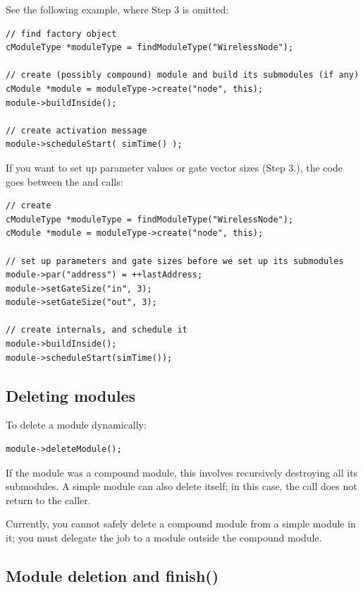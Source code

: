 See the following example, where Step 3 is omitted:

\begin{verbatim}
// find factory object
cModuleType *moduleType = findModuleType("WirelessNode");

// create (possibly compound) module and build its submodules (if any)
cModule *module = moduleType->create("node", this);
module->buildInside();

// create activation message
module->scheduleStart( simTime() );
\end{verbatim}

If you want to set up parameter values or gate vector sizes (Step 3.),
the code goes between the  and
 calls:

\begin{verbatim}
// create
cModuleType *moduleType = findModuleType("WirelessNode");
cModule *module = moduleType->create("node", this);

// set up parameters and gate sizes before we set up its submodules
module->par("address") = ++lastAddress;
module->setGateSize("in", 3);
module->setGateSize("out", 3);

// create internals, and schedule it
module->buildInside();
module->scheduleStart(simTime());
\end{verbatim}


\subsection{Deleting modules}


To delete a module dynamically:

\begin{verbatim}
module->deleteModule();
\end{verbatim}

If the module was a compound module, this involves recursively
destroying all its submodules. A simple module can also delete itself;
in this case, the  call does not return to the
caller.

Currently, you cannot safely delete a
compound module from a simple module
in it; you must delegate the job to a module outside the compound
module.


\subsection{Module deletion and finish()}

